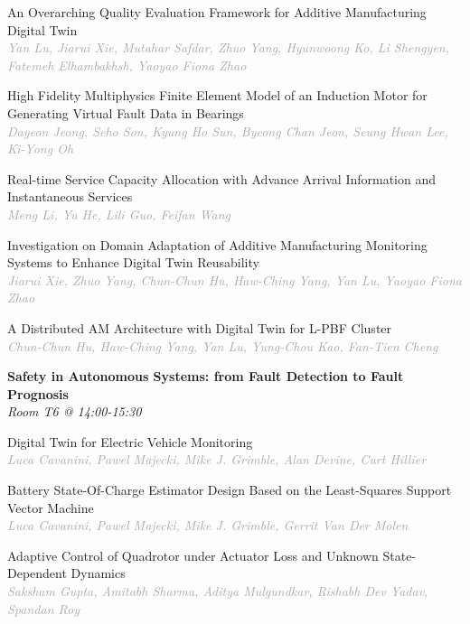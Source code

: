 \begin{multicols*}{2}
\small An Overarching Quality Evaluation Framework for Additive Manufacturing Digital Twin\\ 
\footnotesize \textcolor{darkgray}{\textit{Yan Lu, Jiarui  Xie, Mutahar  Safdar, Zhuo  Yang, Hyunwoong  Ko, Li  Shengyen, Fatemeh  Elhambakhsh, Yaoyao Fiona  Zhao}}

\small High Fidelity Multiphysics Finite Element Model of an Induction Motor for Generating Virtual Fault Data in Bearings\\ 
\footnotesize \textcolor{darkgray}{\textit{Dayeon Jeong, Seho  Son, Kyung Ho  Sun, Byeong Chan  Jeon, Seung Hwan  Lee, Ki-Yong  Oh}}

\small Real-time Service Capacity Allocation with Advance Arrival Information and Instantaneous Services\\ 
\footnotesize \textcolor{darkgray}{\textit{Meng Li, Yu  He, Lili  Guo, Feifan  Wang}}

\small Investigation on Domain Adaptation of Additive Manufacturing Monitoring Systems to Enhance Digital Twin Reusability\\ 
\footnotesize \textcolor{darkgray}{\textit{Jiarui Xie, Zhuo  Yang, Chun-Chun  Hu, Haw-Ching  Yang, Yan  Lu, Yaoyao Fiona  Zhao}}

\small A Distributed AM Architecture with Digital Twin for L-PBF Cluster\\ 
\footnotesize \textcolor{darkgray}{\textit{Chun-Chun Hu, Haw-Ching  Yang, Yan  Lu, Yung-Chou  Kao, Fan-Tien  Cheng}}

\normalsize \textbf{Safety in Autonomous Systems: from Fault Detection to Fault Prognosis}\\
\small \textit{Room T6 @ 14:00-15:30}

\small Digital Twin for Electric Vehicle Monitoring\\ 
\footnotesize \textcolor{darkgray}{\textit{Luca Cavanini, Pawel  Majecki, Mike J.  Grimble, Alan  Devine, Curt  Hillier}}

\small Battery State-Of-Charge Estimator Design Based on the Least-Squares Support Vector Machine\\ 
\footnotesize \textcolor{darkgray}{\textit{Luca Cavanini, Pawel  Majecki, Mike J.  Grimble, Gerrit  Van Der Molen}}

\small Adaptive Control of Quadrotor under Actuator Loss and Unknown State-Dependent Dynamics\\ 
\footnotesize \textcolor{darkgray}{\textit{Saksham Gupta, Amitabh  Sharma, Aditya  Mulgundkar, Rishabh Dev  Yadav, Spandan  Roy}}


\end{multicols*}
